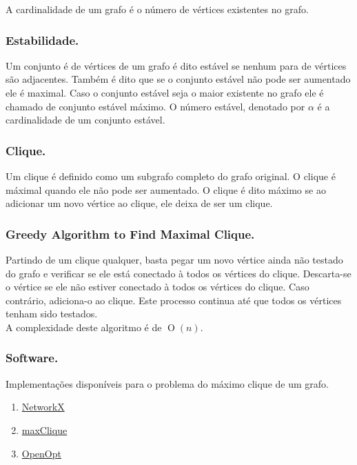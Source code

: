 \documentclass[12pt]{article}
\newcommand{\BigO}[1]{\ensuremath{\operatorname{O}\left(#1\right)}}
\begin{document}
A cardinalidade de um grafo é o número de vértices existentes no grafo.

\subsubsection{Estabilidade.}

Um conjunto é de vértices de um grafo é dito estável se nenhum para de vértices são adjacentes. Também é dito que se o conjunto estável não pode ser aumentado ele é maximal. Caso o conjunto estável seja o maior existente no grafo ele é chamado de conjunto estável máximo. O número estável, denotado por $\alpha$ é a cardinalidade de um conjunto estável.

\subsubsection{Clique.}
Um clique é definido como um subgrafo completo do grafo original. O clique é máximal quando ele não pode ser aumentado. O clique é dito máximo se ao adicionar um novo vértice ao clique, ele deixa de ser um clique.

\subsubsection{Greedy Algorithm to Find Maximal Clique.}

Partindo de um clique qualquer, basta pegar um novo vértice ainda não testado do grafo e verificar se ele está conectado à todos os vértices do clique. Descarta-se o vértice se ele não estiver conectado à todos os vértices do clique. Caso contrário, adiciona-o ao clique. Este processo continua até que todos os vértices tenham sido testados.\\

A complexidade deste algoritmo é de \BigO{n}.

\subsubsection{Software.}

Implementações disponíveis para o problema do máximo clique de um grafo.

\begin{enumerate}
\item \href{http://networkx.github.io/documentation/development/reference/generated/networkx.algorithms.approximation.clique.max_clique.html}{NetworkX}
\item \href{http://www.dcs.gla.ac.uk/~pat/maxClique/distribution/readme.txt}{maxClique}
\item \href{http://openopt.org/MCP}{OpenOpt}
\end{enumerate}
\end{document}
